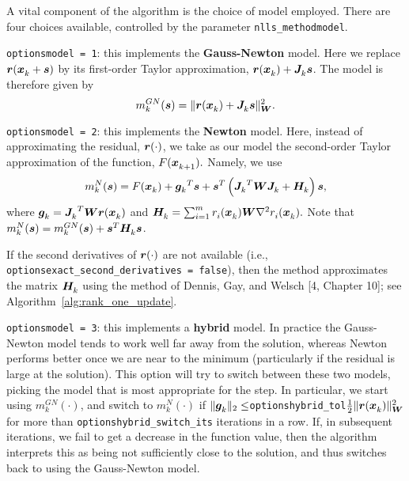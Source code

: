 A vital component of the algorithm is the choice of model employed.  There are four choices
available, controlled by the parameter {\tt  nlls\_method\ct model}.

\begin{description}
  \item {\tt options\ct model = 1}: this implements the {\bf Gauss-Newton} model.  Here we replace $\vr(\iter[k]{\vx} + \vs)$ by its first-order Taylor approximation, $\vr(\iter{\vx}) + \iter{\vJ}\vs$. The model is therefore given by    \begin{equation}
m_k^{GN}(\vs) = \|\vr(\iter{\vx}) + \iter{\vJ}\vs\|_\vW^2.
\label{eq:gauss-newton-model}
\end{equation}
\item {\tt options\ct model = 2}: this implements the {\bf Newton} model.  
Here, instead of approximating the residual, $\vr(\cdot)$, we take as our model the second-order Taylor approximation of the function, $F(\iter[k+1]{\vx}).$  Namely, we use 
\begin{equation}
  \label{eq:newton-model}
  m_k^{N}(\vs) = F(\iter{\vx}) + {\iter{\vg}}^T\vs + \vs^T\left( {\iter{\vJ}}^T \vW \iter{\vJ} + \iter{\vH}\right) \vs,
\end{equation}
where $\iter{\vg} = {\iter{\vJ}}^T\vW \vr(\iter{\vx})$ and $\iter{\vH} = \sum_{i=1}^m\iter[i]{r}(\iter{\vx}) \vW \nabla^2 \iter[i]{r}(\iter{\vx}).$
Note that $m_k^{N}(\vs) = m_k^{GN}(\vs) + \vs^T\iter{\vH} \vs$.  

If the second derivatives of $\vr(\cdot)$ are not available 
(i.e., {\tt options\ct exact\_second\_derivatives = false}), 
then the method approximates the matrix $\iter{\vH}$ using the method of Dennis, Gay, and Welsch [4, Chapter 10]; 
see Algorithm~\ref{alg:rank_one_update}.


\item {\tt options\ct model = 3}: this implements a {\bf hybrid} model.  
In practice the Gauss-Newton model tends to work well far away from the solution, whereas
Newton performs better once we are near to the minimum (particularly if the residual is 
large at the solution).  
This option will try to switch between these two models, picking the model that is most appropriate for the step.  
In particular, we start using $m_k^{GN}(\cdot)$, 
and switch to $m_k^{N}(\cdot)$ if $\|{\iter{\vg}}\|_2 \leq ${\tt options\ct hybrid\_tol}$\frac{1}{2}\|\vr(\iter{\vx})\|^2_\vW$ for more than {\tt options\ct hybrid\_switch\_its} iterations in a row. If, in subsequent iterations, we fail to get 
a decrease in the function value, then the algorithm interprets this as being not sufficiently close to the solution, and thus switches back to using the Gauss-Newton model.


\end{description}

